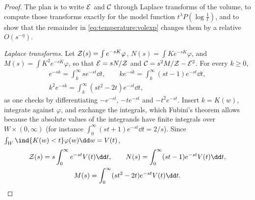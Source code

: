 \begin{refsection}

\begin{proof}
The plan is to write $\mathcal{E}$ and $\mathcal{C}$ through Laplace transforms of the volume, to compute those transforms exactly for the model function $t^\lambda P(\log\frac1t)$, and to show that the remainder in \eqref{eq:temperature:volexp} changes them by a relative $O(s^{-\eta})$.

\emph{Laplace transforms.} Let $\mathcal{Z}(s)=\int e^{-sK}\varphi$, $N(s)=\int Ke^{-sK}\varphi$, and $M(s)=\int K^2e^{-sK}\varphi$, so that $\mathcal{E}=sN/\mathcal{Z}$ and $\mathcal{C}=s^2M/\mathcal{Z}-\mathcal{E}^2$. For every $k\ge0$,
\begin{gather*}
e^{-sk}=\int_k^\infty se^{-st}\dd t,\qquad ke^{-sk}=\int_k^\infty(st-1)e^{-st}\dd t,\\
k^2e^{-sk}=\int_k^\infty(st^2-2t)e^{-st}\dd t,
\end{gather*}
as one checks by differentiating $-e^{-st}$, $-te^{-st}$ and $-t^2e^{-st}$. Insert $k=K(w)$, integrate against $\varphi$, and exchange the integrals, which Fubini's theorem allows because the absolute values of the integrands have finite integrals over $W\times(0,\infty)$ (for instance $\int_0^\infty(st+1)e^{-st}\dd t=2/s$). Since $\int_W\ind\{K(w)<t\}\varphi(w)\dd w=V(t)$,
\begin{equation}\label{eq:temperature:laplace}
\begin{gathered}
\temperatureZ(s)=s\int_0^\infty e^{-st}V(t)\dd t,\qquad N(s)=\int_0^\infty(st-1)e^{-st}V(t)\dd t,\\
M(s)=\int_0^\infty(st^2-2t)e^{-st}V(t)\dd t.
\end{gathered}
\end{equation}


\end{proof}
\end{refsection}
